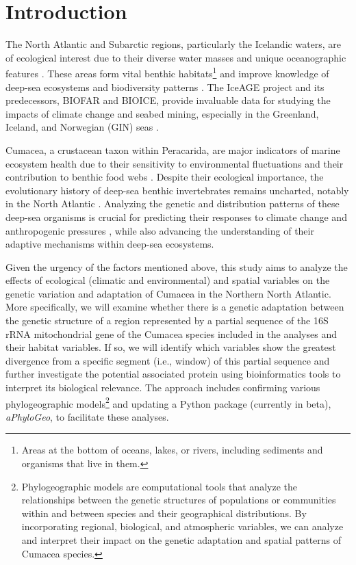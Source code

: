 \section{Introduction}\label{introduction}
The North Atlantic and Subarctic regions, particularly the Icelandic waters, are of ecological interest due to their diverse water masses and unique oceanographic features \citep{schnurr_composition_2014, meisner_benthic_2014, uhlir_adding_2021}. These areas form vital {benthic habitats}\footnote{Areas at the bottom of oceans, lakes, or rivers, including sediments and organisms that live in them.} \citep{levin2009ecological} and improve knowledge of deep-sea ecosystems and biodiversity patterns \citep{rogers2007corals, danovaro2008exponential, uhlir_adding_2021}. The IceAGE project and its predecessors, BIOFAR and BIOICE, provide invaluable data for studying the impacts of climate change and seabed mining, especially in the Greenland, Iceland, and Norwegian (GIN) seas \citep{meisner_prefacebiodiversity_2018}.

Cumacea, a crustacean taxon within Peracarida, are major indicators of marine ecosystem health due to their sensitivity to environmental fluctuations \citep{stransky_diversity_2010} and their contribution to benthic food webs \citep{rehm2009cumacea}. Despite their ecological importance, the evolutionary history of deep-sea benthic invertebrates remains uncharted, notably in the North Atlantic \citep{jennings_phylogeographic_2014}. Analyzing the genetic and distribution patterns of these deep-sea organisms is crucial for predicting their responses to climate change \citep{jennings_phylogeographic_2014} and anthropogenic pressures \citep{meisner_prefacebiodiversity_2018}, while also advancing the understanding of their adaptive mechanisms within deep-sea ecosystems.

Given the urgency of the factors mentioned above, this study aims to analyze the effects of ecological (climatic and environmental) and spatial variables on the genetic variation and adaptation of Cumacea in the Northern North Atlantic. More specifically, we will examine whether there is a genetic adaptation between the genetic structure of a region represented by a partial sequence of the 16S rRNA mitochondrial gene of the Cumacea species included in the analyses and their habitat variables. If so, we will identify which variables show the greatest divergence from a specific segment (i.e., window) of this partial sequence and further investigate the potential associated protein using bioinformatics tools to interpret its biological relevance. The approach includes confirming various phylogeographic models\footnote{Phylogeographic models are computational tools that analyze the relationships between the genetic structures of populations or communities within and between species and their geographical distributions. By incorporating regional, biological, and atmospheric variables, we can analyze and interpret their impact on the genetic adaptation and spatial patterns of Cumacea species.} and updating a Python package (currently in beta), \textit{aPhyloGeo}, to facilitate these analyses.

